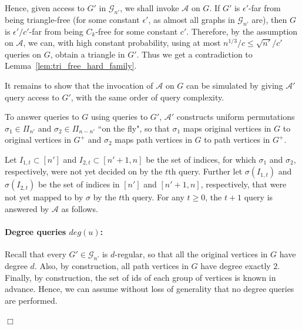 \documentclass{article}
\newcommand{\eps}{\epsilon}
\newcommand{\calA}{{\mathcal{A}}}
\newcommand{\mA}{{\mathcal{A}}}
\newcommand{\mG}{{\mathcal{G}}}
\newcommand{\trn}{{n'}}
\newcommand{\trG}{{G'}}
\newcommand{\trA}{{\calA'}}
\newcommand{\treps}{{\eps'}}
\newenvironment{proofof}[1]{\smallskip\noindent{\bf Proof of #1:}}%
        {\hspace*{\fill}$\Box$\par}
\newcommand{\commentt}[1]{ {}}
\begin{document}
\begin{proofof}{Theorem~\ref{thm:lb_ck_const_alpha}}
Hence, given access to $\trG$ in $\mG_{\trn}$,  we shall invoke $\mA$ on $G$.
If $\trG$ is $\treps$-far from being triangle-free (for some constant $\treps$, as almost all graphs in $\mG_{\trn}$ are), then $G$ is $\treps/c'$-far from being $C_k$-free for some constant $c'$. Therefore, by the assumption on $\mA$, we can, with high constant probability, using %
at most $n^{1/3}/c \leq \sqrt{\trn}/c'$ %
queries on $G$, 
obtain a triangle in $\trG$.
Thus we get a contradiction to Lemma~\ref{lem:tri_free_hard_family}. 

It remains to show that  the invocation of $\mA$ on $G$ can be simulated by giving $\trA$ query access to $\trG$, with the same order of query complexity. %


To answer queries to $G$ using queries to $\trG$, $\trA$ constructs uniform permutations $\sigma_1\in\Pi_{\trn}$ and $\sigma_2 \in \Pi_{n-\trn}$ ``on the fly", so that  $\sigma_1$ maps original vertices in $G$ to original vertices in $G^+$ and $\sigma_2$ maps path vertices in $G$ to path vertices in $G^+$.  

Let $I_{1,t}\subset[\trn]$ and $I_{2,t}\subset [\trn+1, n]$ be the set of indices,  for which $\sigma_1$ and $\sigma_2$, respectively,  were not yet decided on by the $t$th query.  Further let  $\sigma(I_{1,t})$ and $\sigma(I_{2,t})$ be the set of indices in $[\trn]$ and $[\trn+1, n]$, respectively, that were not yet mapped to by $\sigma$ by the $t$th query.
For any $t\geq 0$,  the $t+1$ query is   answered by $\mA$ as follows. 



\paragraph{Degree queries $deg(u)$:} 



Recall that every $\trG\in \mG_{\trn}$ is $d$-regular, so that all the original vertices in $G$ have degree $d$. Also, by construction, all path vertices in $G$ have degree exactly $2$. Finally, by construction, the set of ids of each group of vertices is known in advance. Hence, we can assume without loss of generality that no degree queries are performed.



\end{proofof}
\end{document}

